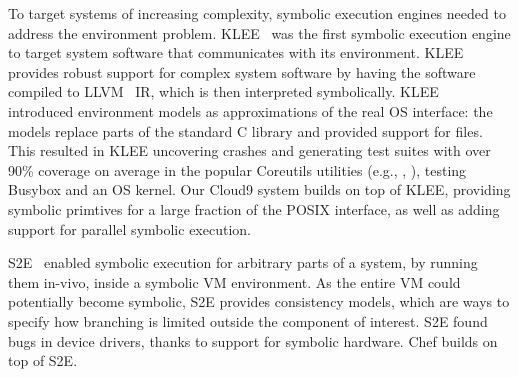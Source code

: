 To target systems of increasing complexity, symbolic execution engines needed to address the environment problem.
%
KLEE~\cite{klee} was the first symbolic execution engine to target system software that communicates with its environment.  KLEE provides robust support for complex system software by having the software compiled to LLVM~\cite{llvm} IR, which is then interpreted symbolically.
%
KLEE~\cite{klee} introduced environment models as approximations of the real OS interface: the models replace parts of the standard C library and provided support for files.
%
This resulted in KLEE uncovering crashes and generating test suites with over 90\% coverage on average in the popular Coreutils utilities (e.g., , ), testing Busybox and an OS kernel.
%
Our Cloud9 system builds on top of KLEE, providing symbolic primtives for a large fraction of the POSIX interface, as well as adding support for parallel symbolic execution.

S2E~\cite{s2eSystem} enabled symbolic execution for arbitrary parts of a system, by running them in-vivo, inside a symbolic VM environment.  As the entire VM could potentially become symbolic, S2E provides consistency models, which are ways to specify how branching is limited outside the component of interest.  S2E found bugs in device drivers, thanks to support for symbolic hardware.
%
Chef builds on top of S2E.










